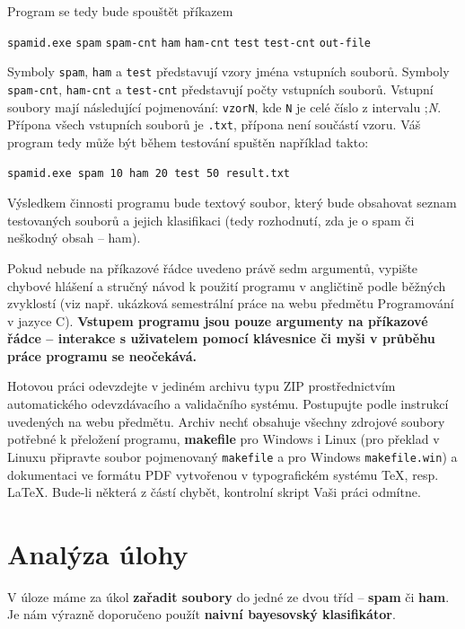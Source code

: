 \documentclass[12pt]{report}
\newcommand\la{\textlangle}  					%
\newcommand\ra{\textrangle}						%
\newcommand\laratexttt[1]{\la\texttt{#1}\ra}	%
\newcommand\indentt[1]{						
	\setlength\parindent{5mm}
	#1
	\setlength\parindent{0mm}
	}											%
\begin{document}
	Program se tedy bude spouštět příkazem
	
	\indentt{\texttt{spamid.exe} \laratexttt{spam} \laratexttt{spam-cnt} \laratexttt{ham} \laratexttt{ham-cnt} \laratexttt{test} \laratexttt{test-cnt} \laratexttt{out-file}$\,$\keys{\return}}
	
	Symboly \laratexttt{spam}, \laratexttt{ham} a \laratexttt{test} představují vzory jména vstupních souborů. Symboly \laratexttt{spam-cnt}, \laratexttt{ham-cnt} a \laratexttt{test-cnt} představují počty vstupních souborů. Vstupní soubory mají následující pojmenování: \texttt{vzorN}, kde \texttt{N} je celé číslo z intervalu \la1;\textit{N}\ra. Přípona všech vstupních souborů je \texttt{.txt}, přípona není součástí vzoru. Váš program tedy může být během testování spuštěn například takto:
	
	\indentt{
	\texttt{spamid.exe spam 10 ham 20 test 50 result.txt}$\,$\keys{\return}
	}
	
	Výsledkem činnosti programu bude textový soubor, který bude obsahovat seznam testovaných souborů a jejich klasifikaci (tedy rozhodnutí, zda je o spam či neškodný obsah – ham).
	
	Pokud nebude na příkazové řádce uvedeno právě sedm argumentů, vypište chybové hlášení a stručný návod k použití programu v angličtině podle běžných zvyklostí (viz např. ukázková semestrální práce na webu předmětu Programování v jazyce C). \textbf{Vstupem programu jsou pouze argumenty na příkazové řádce – interakce s uživatelem pomocí klávesnice či myši v průběhu práce programu se neočekává.}
	
	Hotovou práci odevzdejte v jediném archivu typu ZIP prostřednictvím automatického odevzdávacího a validačního systému. Postupujte podle instrukcí uvedených na webu předmětu. Archiv nechť obsahuje všechny zdrojové soubory potřebné k přeložení programu, \textbf{makefile} pro Windows i Linux (pro překlad v Linuxu připravte soubor pojmenovaný \texttt{makefile} a pro Windows \texttt{makefile.win}) a dokumentaci ve formátu PDF vytvořenou v typografickém systému \TeX, resp. \LaTeX. Bude-li některá z částí chybět, kontrolní skript Vaši práci odmítne.

	\chapter{Analýza úlohy}
	V úloze máme za úkol \textbf{zařadit soubory} do jedné ze dvou tříd – \textbf{spam} či \textbf{ham}. Je nám výrazně doporučeno použít \textbf{naivní bayesovský klasifikátor}.
	
\end{document}
